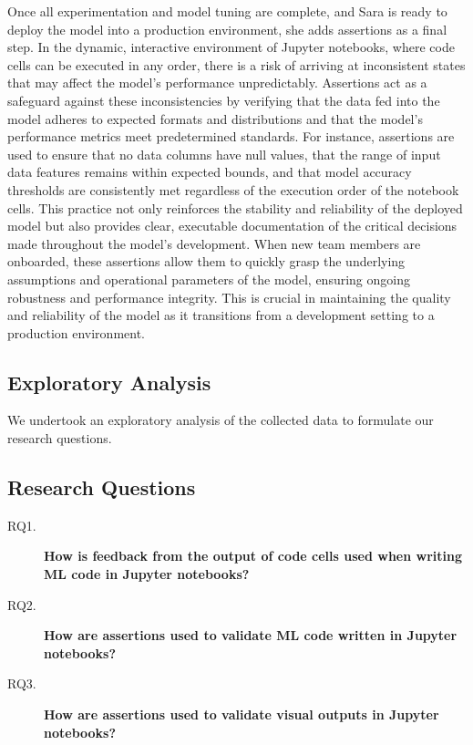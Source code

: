 Once all experimentation and model tuning are complete, and Sara is ready to deploy the model into a production environment, she adds assertions as a final step. In the dynamic, interactive environment of Jupyter notebooks, where code cells can be executed in any order, there is a risk of arriving at inconsistent states that may affect the model's performance unpredictably. Assertions act as a safeguard against these inconsistencies by verifying that the data fed into the model adheres to expected formats and distributions and that the model's performance metrics meet predetermined standards. For instance, assertions are used to ensure that no data columns have null values, that the range of input data features remains within expected bounds, and that model accuracy thresholds are consistently met regardless of the execution order of the notebook cells. This practice not only reinforces the stability and reliability of the deployed model but also provides clear, executable documentation of the critical decisions made throughout the model's development. When new team members are onboarded, these assertions allow them to quickly grasp the underlying assumptions and operational parameters of the model, ensuring ongoing robustness and performance integrity. This is crucial in maintaining the quality and reliability of the model as it transitions from a development setting to a production environment.

\subsection{Exploratory Analysis}

We undertook an exploratory analysis of the collected data to formulate our research questions.

\subsection{Research Questions}

\begin{description}
  \item[RQ1.] \textbf{How is feedback from the output of code cells used when writing ML code in Jupyter notebooks?}
  \item[RQ2.] \textbf{How are assertions used to validate ML code written in Jupyter notebooks?}
  \item[RQ3.] \textbf{How are assertions used to validate visual outputs in Jupyter notebooks?}
\end{description}

